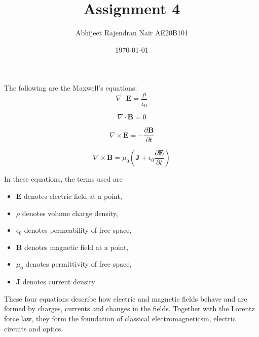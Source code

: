 \documentclass[a4paper, 12pt]{article}
\begin{document}
\title{Assignment 4}
\author{Abhijeet Rajendran Nair AE20B101}
\date{\today}
\maketitle

The following are the Maxwell's equations:
\begin{equation}
\nabla \cdot \mathbf{E} = \frac{\rho}{\epsilon_0}
\end{equation}

\begin{equation}
\nabla \cdot \mathbf{B} = 0
\end{equation}

\begin{equation}
\nabla \times \mathbf{E} = - \frac{\partial \mathbf{B}}{\partial t}
\end{equation}

\begin{equation}
\nabla \times \mathbf{B} = \mu_0 (\mathbf{J} + \epsilon_0 \frac{\partial \mathbf{E}}{\partial t})
\end{equation}

In these equations, the terms used are
\begin{itemize}
  \item $\mathbf{E}$ denotes electric field at a point,
  \item $\rho$ denotes volume charge density,
  \item $\epsilon_0$ denotes permeability of free space,
  \item $\mathbf{B}$ denotes magnetic field at a point,
  \item $\mu_0$ denotes permittivity of free space,
  \item $\mathbf{J}$ denotes current density
\end{itemize}

These four equations describe how electric and magnetic fields behave 
and are formed by charges, currents and changes 
in the fields. Together with the Lorentz force law, 
they form the foundation of classical electromagneticsm, electric circuits 
and optics.
\end{document}
